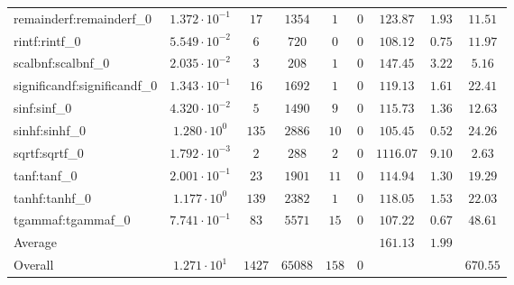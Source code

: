 \begin{tabular}{|l|c|c|c|c|c|c|c|c|}
remainderf:remainderf\_0     & $ 1.372 \cdot 10^{-1} $ & $ 17     $ & $ 1354  $ & $ 1   $ & $ 0   $ & $ 123.87      $ & $ 1.93    $ & $ 11.51   $ \\
rintf:rintf\_0               & $ 5.549 \cdot 10^{-2} $ & $ 6      $ & $ 720   $ & $ 0   $ & $ 0   $ & $ 108.12      $ & $ 0.75    $ & $ 11.97   $ \\
scalbnf:scalbnf\_0           & $ 2.035 \cdot 10^{-2} $ & $ 3      $ & $ 208   $ & $ 1   $ & $ 0   $ & $ 147.45      $ & $ 3.22    $ & $ 5.16    $ \\
significandf:significandf\_0 & $ 1.343 \cdot 10^{-1} $ & $ 16     $ & $ 1692  $ & $ 1   $ & $ 0   $ & $ 119.13      $ & $ 1.61    $ & $ 22.41   $ \\
sinf:sinf\_0                 & $ 4.320 \cdot 10^{-2} $ & $ 5      $ & $ 1490  $ & $ 9   $ & $ 0   $ & $ 115.73      $ & $ 1.36    $ & $ 12.63   $ \\
sinhf:sinhf\_0               & $ 1.280 \cdot 10^{0}  $ & $ 135    $ & $ 2886  $ & $ 10  $ & $ 0   $ & $ 105.45      $ & $ 0.52    $ & $ 24.26   $ \\
sqrtf:sqrtf\_0               & $ 1.792 \cdot 10^{-3} $ & $ 2      $ & $ 288   $ & $ 2   $ & $ 0   $ & $ 1116.07     $ & $ 9.10    $ & $ 2.63    $ \\
tanf:tanf\_0                 & $ 2.001 \cdot 10^{-1} $ & $ 23     $ & $ 1901  $ & $ 11  $ & $ 0   $ & $ 114.94      $ & $ 1.30    $ & $ 19.29   $ \\
tanhf:tanhf\_0               & $ 1.177 \cdot 10^{0}  $ & $ 139    $ & $ 2382  $ & $ 1   $ & $ 0   $ & $ 118.05      $ & $ 1.53    $ & $ 22.03   $ \\
tgammaf:tgammaf\_0           & $ 7.741 \cdot 10^{-1} $ & $ 83     $ & $ 5571  $ & $ 15  $ & $ 0   $ & $ 107.22      $ & $ 0.67    $ & $ 48.61   $ \\
\hline
Average                      & $                     $ & $        $ & $       $ & $     $ & $     $ & $ 161.13      $ & $ 1.99    $ & $         $ \\
\hline
Overall                      & $ 1.271 \cdot 10^{1}  $ & $ 1427   $ & $ 65088 $ & $ 158 $ & $ 0   $ & $             $ & $         $ & $ 670.55  $ \\
\hline
\end{tabular}
